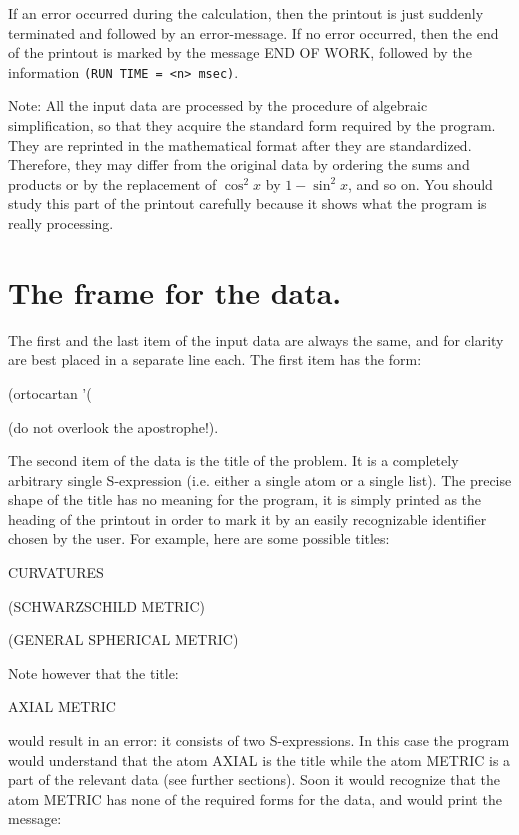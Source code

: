If an error occurred during the calculation,  then  the
     printout  is  just  suddenly  terminated  and followed by an
error-message. If no error occurred, then  the  end  of  the
     printout  is  marked by the message END OF WORK, followed by
     the information \verb+(RUN TIME = <n> msec)+.

Note: All the input data are processed by the procedure of  algebraic
simplification, so that they acquire the standard form required by the program.
They are reprinted in the mathematical format after they are standardized.
Therefore, they may differ from
     the original data by ordering the sums and  products  or  by
the replacement of $\cos^2 x$ by $1 - \sin^2 x$, and so on. You should
     study this part of the printout carefully because  it  shows
     what the program is really processing.

\section{The frame for the data.}

The first and the last  item  of  the  input  data  are always  the same, and
for clarity are best placed in a separate line each. The first item has the
form:

\bigskip

      (ortocartan '(

\bigskip

\noindent (do not overlook the apostrophe!).

The second item  of  the  data  is  the  title  of  the
     problem.  It  is  a completely arbitrary single S-expression
     (i.e. either a single atom or a single  list).  The  precise
     shape  of  the  title  has no meaning for the program, it is
     simply printed as the heading of the printout  in  order  to
     mark  it  by an easily recognizable identifier chosen by the
     user. For example, here are some possible titles:

\bigskip

     CURVATURES

     (SCHWARZSCHILD METRIC)

     (GENERAL SPHERICAL METRIC)

\bigskip

\noindent Note however that the title:

\bigskip

     AXIAL METRIC

\bigskip

\noindent would result in an error: it consists of two  S-expressions.
     In  this  case  the  program  would understand that the atom
     AXIAL is the title while the atom METRIC is a  part  of  the
relevant  data  (see  further sections). Soon it would recognize that the atom
METRIC has none of  the  required  forms
     for the data, and would print the message:

